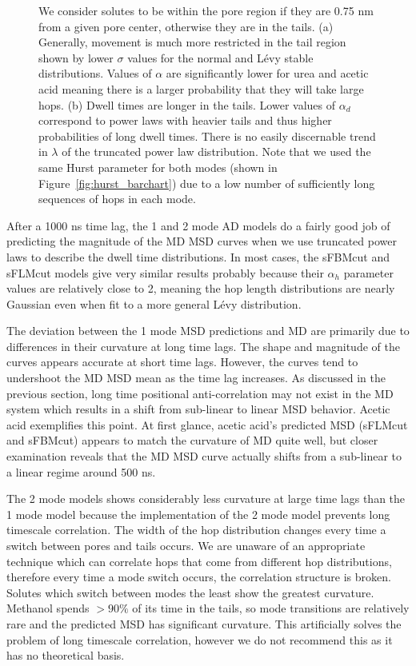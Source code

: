 \documentclass{article}
\begin{document}
\begin{figure}
{  We consider solutes to be within the pore region if they are 0.75 nm from a given pore
  center, otherwise they are in the tails. (a) Generally, movement is much more restricted
  in the tail region shown by lower $\sigma$ 
  values for the normal and L\'evy stable 
  distributions. Values of $\alpha$ are significantly lower for urea and acetic acid meaning 
  there is a larger probability that they will take large hops. (b) Dwell times are longer in 
  the tails. Lower values of $\alpha_d$ correspond to power laws with heavier tails and 
  thus higher probabilities of long dwell times. There is no easily discernable trend in
  $\lambda$ of the truncated power law distribution. Note that we used the same Hurst parameter
  for both modes (shown in Figure~\ref{fig:hurst_barchart}) due to a low number of 
  sufficiently long sequences of hops in each mode.}
  \label{fig:2mode_parameters}
  \end{figure} 
  
  After a 1000 ns time lag, the 1 and 2 mode AD models do a fairly good job of 
  predicting the magnitude of the MD MSD curves when we use truncated power
  laws to describe the dwell time distributions. In most cases, the sFBMcut
  and sFLMcut models give very similar results probably because their $\alpha_h$
  parameter values are relatively close to 2, meaning the hop length distributions
  are nearly Gaussian even when fit to a more general L\'evy distribution. 
  
  The deviation between the 1 mode MSD predictions and MD are primarily due
  to differences in their curvature at long time lags. The shape and magnitude of the curves appears accurate 
  at short time lags.  
  However, the curves tend to undershoot the MD MSD mean
  as the time lag increases. As discussed in the previous section, long time
  positional anti-correlation may not exist in the MD system which results 
  in a shift from sub-linear to linear MSD behavior. Acetic acid exemplifies
  this point. At first glance, acetic acid's predicted MSD (sFLMcut and sFBMcut)
  appears to match the curvature of MD quite well, but closer examination reveals
  that the MD MSD curve actually shifts from a sub-linear to a linear regime 
  around 500 ns.
  
  The 2 mode models shows considerably less curvature at large time lags than
  the 1 mode model because the implementation of the 2 mode model prevents long
  timescale correlation. The width of the hop distribution changes every time
  a switch between pores and tails occurs. We are unaware of an appropriate
  technique which can correlate hops that come from different hop distributions, 
  therefore every time a mode switch occurs, the correlation structure is 
  broken. Solutes which switch between modes the least show the greatest
  curvature. Methanol spends $> 90\%$ of its time in the tails, so mode transitions
  are relatively rare and the predicted MSD has significant curvature. This artificially
  solves the problem of long timescale correlation, however we do not recommend this
  as it has no theoretical basis.
  
\end{document}
